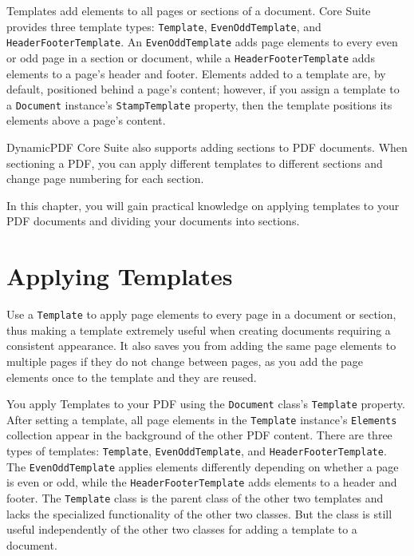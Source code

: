 \documentclass[american]{tufte-book}
\numberwithin{equation}{section}
\numberwithin{figure}{section}
\begin{document}
Templates add elements to all pages or sections of a document. Core
Suite provides three template types: \texttt{Template}, \texttt{EvenOddTemplate},
and \texttt{HeaderFooterTemplate}.  An \texttt{EvenOddTemplate} adds
page elements to every even or odd page in a section or document,
while a \texttt{HeaderFooterTemplate} adds elements to a page's header
and footer. Elements added to a template are, by default, positioned
behind a page's content; however, if you assign a template to a \texttt{Document}
instance's \texttt{StampTemplate} property, then the template positions
its elements above a page's content.

DynamicPDF Core Suite also supports adding sections to PDF documents.
When sectioning a PDF, you can apply different templates to different
sections and change page numbering for each section. 

In this chapter, you will gain practical knowledge on applying templates
to your PDF documents and dividing your documents into sections.

\section{Applying Templates}

Use a \texttt{Template} to apply page elements to every page in a
document or section, thus making a template extremely useful when
creating documents requiring a consistent appearance. It also saves you
from adding the same page elements to multiple pages if they do not
change between pages, as you add the page elements once to the template and they are reused. 

You apply Templates to your PDF using the \texttt{Document} class's
\texttt{Template} property. After setting a template, all page elements
in the \texttt{Template} instance's \texttt{Elements} collection 
appear in the background of the other PDF content. There are three types of templates: \texttt{Template}, \texttt{EvenOddTemplate},
and \texttt{HeaderFooterTemplate}. The \texttt{EvenOddTemplate} applies
elements differently depending on whether a page is even or odd, while
the \texttt{HeaderFooterTemplate} adds elements to a header and footer.
The \texttt{Template} class is the parent class of the other two templates
and lacks the specialized functionality of the other two classes. But the class is still useful independently of the other two classes for adding a template to a document.
\end{document}
